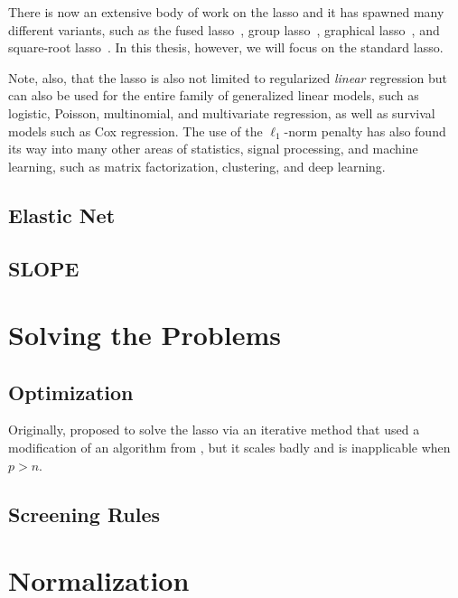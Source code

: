 There is now an extensive body of work on the lasso and it has spawned many different variants, such as the fused lasso~\parencite{tibshirani2005}, group lasso~\parencite{yuan2005}, graphical lasso~\parencite{friedman2008}, and square-root lasso~\parencite{belloni2011}. In this thesis, however, we will focus on the standard lasso.

Note, also, that the lasso is also not limited to regularized \emph{linear} regression but can also be used for the entire family of generalized linear models, such as logistic, Poisson, multinomial, and multivariate regression, as well as survival models such as Cox regression. The use of the \(\ell_1\)-norm penalty has also found its way into many other areas of statistics, signal processing, and machine learning, such as matrix factorization, clustering, and deep learning.



\subsection{Elastic Net}

\subsection{SLOPE}

\section{Solving the Problems}

\subsection{Optimization}

Originally, \textcite{tibshirani1996} proposed to solve the lasso via an iterative method that used a modification of an algorithm from \textcite{lawson1995}, but it scales badly and is inapplicable when \(p > n\).

\subsection{Screening Rules}

\section{Normalization}

